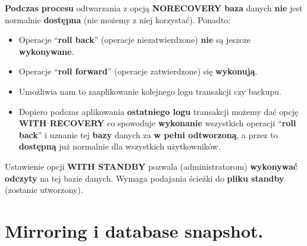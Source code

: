 \documentclass[a4paper]{article}
\begin{document}
    \textbf{Podczas procesu} odtwarzania z opcją \textbf{NORECOVERY baza} danych \textbf{nie} jest normalnie
    \textbf{dostępna} (nie możemy z niej korzystać). Ponadto:
    \begin{itemize}[noitemsep]
        \item Operacje ``\textbf{roll back}'' (operacje niezatwierdzone) \textbf{nie} są jeszcze \textbf{wykonywane}.
        \item Operacje ``\textbf{roll forward}'' (operacje zatwierdzone) się \textbf{wykonują}.
        \item Umożliwia nam to zaaplikowanie kolejnego logu transakcji czy backupu.
        \item Dopiero
        podczas aplikowania \textbf{ostatniego logu} transakcji możemy dać opcję \textbf{WITH RECOVERY} co spowoduje
        \textbf{wykonanie} wszystkich
        operacji ``\textbf{roll back}'' i uznanie tej \textbf{bazy} danych za \textbf{w pełni odtworzoną}, a przez to
        \textbf{dostępną} już normalnie dla
        wszystkich użytkowników.
    \end{itemize}

    Ustawienie opcji \textbf{WITH STANDBY} pozwala (administratorom) \textbf{wykonywać odczyty} na tej bazie danych.
    Wymaga podajania ścieżki do \textbf{pliku standby} (zostanie utworzony).


    \section{Mirroring i database snapshot.}
\end{document}
